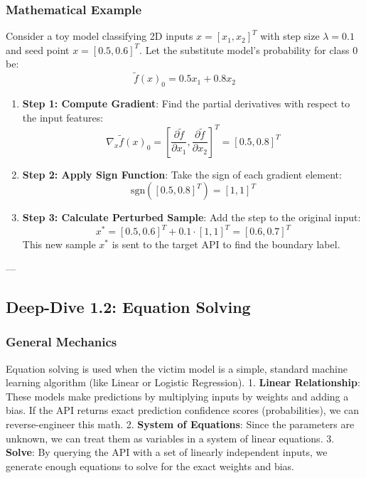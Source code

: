 \documentclass{article}
\begin{document}
\subsubsection{Mathematical Example}
Consider a toy model classifying 2D inputs $x = [x_1, x_2]^T$ with step size $\lambda = 0.1$ and seed point $x = [0.5, 0.6]^T$. Let the substitute model's probability for class 0 be:
$$\tilde{f}(x)_0 = 0.5 x_1 + 0.8 x_2$$

\begin{enumerate}
    \item \textbf{Step 1: Compute Gradient}: Find the partial derivatives with respect to the input features:
    $$\nabla_x \tilde{f}(x)_0 = \left[ \frac{\partial \tilde{f}}{\partial x_1}, \frac{\partial \tilde{f}}{\partial x_2} \right]^T = [0.5, 0.8]^T$$
    
    \item \textbf{Step 2: Apply Sign Function}: Take the sign of each gradient element:
    $$\text{sgn}([0.5, 0.8]^T) = [1, 1]^T$$
    
    \item \textbf{Step 3: Calculate Perturbed Sample}: Add the step to the original input:
    $$x^* = [0.5, 0.6]^T + 0.1 \cdot [1, 1]^T = [0.6, 0.7]^T$$
    This new sample $x^*$ is sent to the target API to find the boundary label.
\end{enumerate}

---

\subsection{Deep-Dive 1.2: Equation Solving}

\subsubsection{General Mechanics}
Equation solving is used when the victim model is a simple, standard machine learning algorithm (like Linear or Logistic Regression). 
1. \textbf{Linear Relationship}: These models make predictions by multiplying inputs by weights and adding a bias. If the API returns exact prediction confidence scores (probabilities), we can reverse-engineer this math.
2. \textbf{System of Equations}: Since the parameters are unknown, we can treat them as variables in a system of linear equations.
3. \textbf{Solve}: By querying the API with a set of linearly independent inputs, we generate enough equations to solve for the exact weights and bias.
\end{document}
